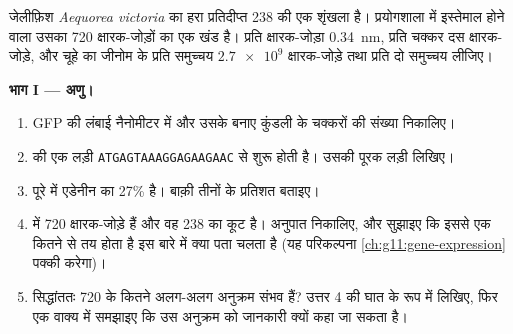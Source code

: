 \begin{problem}
\label{pb:g10:universal-dna:1}
जेलीफ़िश \emph{Aequorea victoria} का हरा प्रतिदीप्त  238  की एक शृंखला है। प्रयोगशाला में इस्तेमाल होने वाला उसका  720
क्षारक-जोड़ों का एक  खंड है। प्रति क्षारक-जोड़ा \qty{0.34}{nm}, प्रति
चक्कर दस क्षारक-जोड़े, और चूहे का जीनोम  के प्रति समुच्चय
$\num{2.7e9}$ क्षारक-जोड़े तथा प्रति  दो समुच्चय लीजिए।

\medskip
\noindent\textbf{भाग I --- अणु।}
\begin{enumerate}
  \item GFP  की लंबाई नैनोमीटर में और उसके बनाए कुंडली के चक्करों की
        संख्या निकालिए।
  \item {} की एक लड़ी \texttt{ATGAGTAAAGGAGAAGAAC} से शुरू होती है।
        उसकी पूरक लड़ी लिखिए।
  \item पूरे  में एडेनीन  का 27\% है। बाक़ी तीनों  के
        प्रतिशत बताइए।
  \item {} में 720 क्षारक-जोड़े हैं और वह 238  का कूट है।
        अनुपात निकालिए, और सुझाइए कि इससे एक  कितने 
        से तय होता है इस बारे में क्या पता चलता है (यह परिकल्पना
        \cref{ch:g11:gene-expression} पक्की करेगा)।
  \item सिद्धांततः 720  के कितने अलग-अलग अनुक्रम संभव हैं? उत्तर
        4 की घात के रूप में लिखिए, फिर एक वाक्य में समझाइए कि उस अनुक्रम
        को जानकारी क्यों कहा जा सकता है।
\end{enumerate}


\end{problem}
